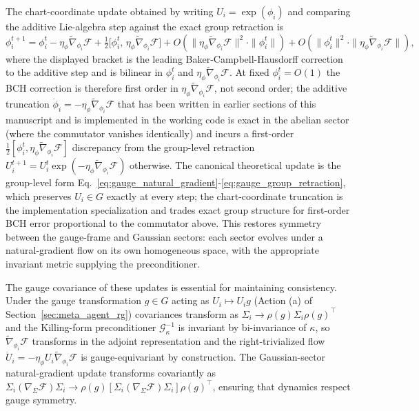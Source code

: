 \documentclass[11pt]{article}
\begin{document}
The chart-coordinate update obtained by writing $U_i = \exp(\phi_i)$ and comparing the additive Lie-algebra step against the exact group retraction is
\begin{equation}
\phi_i^{t+1} = \phi_i^t - \eta_\phi \tilde{\nabla}_{\phi_i} \mathcal{F} + \tfrac{1}{2}\big[\phi_i^t,\, \eta_\phi \tilde{\nabla}_{\phi_i}\mathcal{F}\big] + O(\|\eta_\phi \tilde{\nabla}_{\phi_i}\mathcal{F}\|^2 \cdot \|\phi_i^t\|) + O(\|\phi_i^t\|^2 \cdot \|\eta_\phi \tilde{\nabla}_{\phi_i}\mathcal{F}\|),
\label{eq:bch_chart_step}
\end{equation}
where the displayed bracket is the leading Baker-Campbell-Hausdorff correction to the additive step and is bilinear in $\phi_i^t$ and $\eta_\phi \tilde{\nabla}_{\phi_i}\mathcal{F}$. At fixed $\phi_i^t = O(1)$ the BCH correction is therefore first order in $\eta_\phi \tilde{\nabla}_{\phi_i}\mathcal{F}$, not second order; the additive truncation $\dot{\phi}_i = -\eta_\phi \tilde{\nabla}_{\phi_i}\mathcal{F}$ that has been written in earlier sections of this manuscript and is implemented in the working code is exact in the abelian sector (where the commutator vanishes identically) and incurs a first-order $\tfrac{1}{2}[\phi_i^t, \eta_\phi \tilde{\nabla}_{\phi_i}\mathcal{F}]$ discrepancy from the group-level retraction $U_i^{t+1} = U_i^t \exp(-\eta_\phi \tilde{\nabla}_{\phi_i}\mathcal{F})$ otherwise. The canonical theoretical update is the group-level form Eq.~\eqref{eq:gauge_natural_gradient}-\eqref{eq:gauge_group_retraction}, which preserves $U_i \in G$ exactly at every step; the chart-coordinate truncation is the implementation specialization and trades exact group structure for first-order BCH error proportional to the commutator above. This restores symmetry between the gauge-frame and Gaussian sectors: each sector evolves under a natural-gradient flow on its own homogeneous space, with the appropriate invariant metric supplying the preconditioner.

The gauge covariance of these updates is essential for maintaining consistency. Under the gauge transformation $g \in G$ acting as $U_i \mapsto U_i g$ (Action (a) of Section~\ref{sec:meta_agent_rg}) covariances transform as $\Sigma_i \to \rho(g) \Sigma_i \rho(g)^\top$ and the Killing-form preconditioner $\mathcal{G}_\kappa^{-1}$ is invariant by bi-invariance of $\kappa$, so $\tilde{\nabla}_{\phi_i}\mathcal{F}$ transforms in the adjoint representation and the right-trivialized flow $\dot U_i = -\eta_\phi U_i \tilde{\nabla}_{\phi_i}\mathcal{F}$ is gauge-equivariant by construction. The Gaussian-sector natural-gradient update transforms covariantly as $\Sigma_i (\nabla_\Sigma \mathcal{F}) \Sigma_i \to \rho(g)[\Sigma_i (\nabla_\Sigma \mathcal{F}) \Sigma_i]\rho(g)^\top$, ensuring that dynamics respect gauge symmetry.
\end{document}

